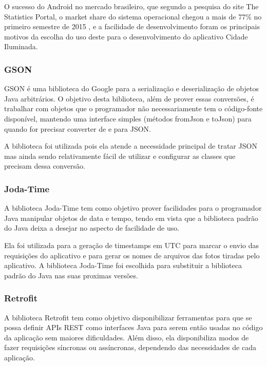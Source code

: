 \documentclass[
	article,			%
	11pt,				%
	oneside,			%
	a4paper,			%
	english,			%
	brazil,				%
	sumario=tradicional
	]{abntex2}
\begin{document}
O sucesso do Android no mercado brasileiro, que segundo a pesquisa do site The
Statistics Portal, o market share do sistema operacional chegou a mais de
77\% no primeiro semestre de 2015 \cite{statista}, e a facilidade de desenvolvimento foram
os principais motivos da escolha do uso deste para o desenvolvimento do
aplicativo Cidade Iluminada.

\subsubsection{GSON}

GSON é uma biblioteca do Google para a serialização e deserialização de objetos
Java arbitrários. O objetivo desta biblioteca, além de prover essas conversões,
é trabalhar com objetos que o programador não necessariamente tem o código-fonte
disponível, mantendo uma interface simples (métodos fromJson e toJson) para
quando for precisar converter de e para JSON. \cite{gson}

A biblioteca foi utilizada pois ela atende a necessidade principal de tratar
JSON mas ainda sendo relativamente fácil de utilizar e configurar as classes
que precisam dessa conversão.

\subsubsection{Joda-Time}

A biblioteca Joda-Time tem como objetivo prover facilidades para o programador Java
manipular objetos de data e tempo, tendo em vista que a biblioteca padrão do Java
deixa a desejar no aspecto de facilidade de uso.

Ela foi utilizada para a geração de timestamps em UTC para marcar o envio das
requisições do aplicativo e para gerar os nomes de arquivos das fotos tiradas
pelo aplicativo. A biblioteca Joda-Time foi escolhida para substituir a
biblioteca padrão do Java nas suas proximas versões.\cite{jodatime}

\subsubsection{Retrofit}

A biblioteca Retrofit tem como objetivo disponibilizar ferramentas para que se
possa definir APIs REST como interfaces Java para serem então usadas no código
da aplicação sem maiores dificuldades. Além disso, ela disponibiliza modos de
fazer requisições síncronas ou assíncronas, dependendo das necessidades de cada
aplicação.\cite{retrofit}
\end{document}
